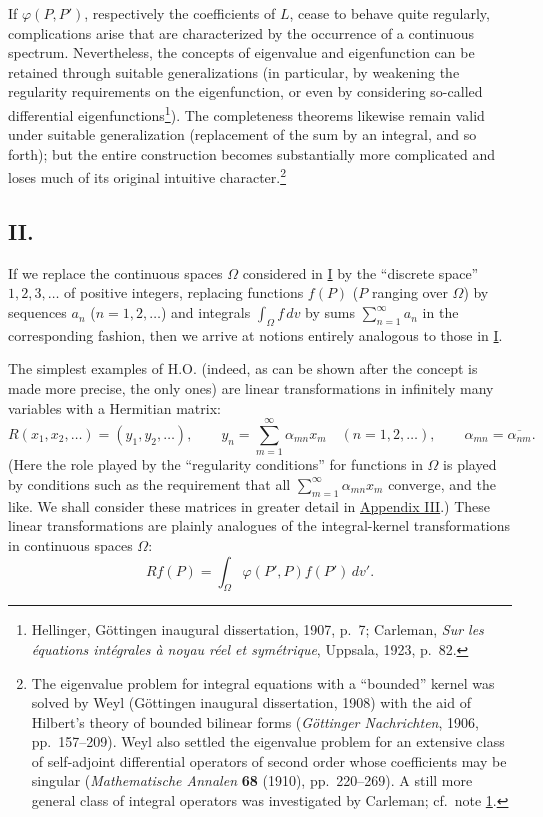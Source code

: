 ﻿\documentclass[paper=b5,fontsize=13pt,bookmarkpackage=false,twoside]{scrartcl}
\begin{document}
If $\varphi(P,P')$, respectively the coefficients of $L$, cease to behave quite regularly, complications arise that are characterized by the occurrence of a continuous spectrum. Nevertheless, the concepts of eigenvalue and eigenfunction can be retained through suitable generalizations (in particular, by weakening the regularity requirements on the eigenfunction, or even by considering so-called differential eigenfunctions\footnote{\label{fn:source-4}Hellinger, Göttingen inaugural dissertation, 1907, p.~7; Carleman, \emph{Sur les équations intégrales à noyau réel et symétrique}, Uppsala, 1923, p.~82.}). The completeness theorems likewise remain valid under suitable generalization (replacement of the sum by an integral, and so forth); but the entire construction becomes substantially more complicated and loses much of its original intuitive character.\footnote{\label{fn:source-5}The eigenvalue problem for integral equations with a ``bounded'' kernel was solved by Weyl (Göttingen inaugural dissertation, 1908) with the aid of Hilbert's theory of bounded bilinear forms (\emph{Göttinger Nachrichten}, 1906, pp.~157--209). Weyl also settled the eigenvalue problem for an extensive class of self-adjoint differential operators of second order whose coefficients may be singular (\emph{Mathematische Annalen} \textbf{68} (1910), pp.~220--269). A still more general class of integral operators was investigated by Carleman; cf.\ note \ref{fn:source-4}.}

\subsection*{II.}\label{intro:II}

If we replace the continuous spaces $\Omega$ considered in \hyperref[intro:I]{I} by the ``discrete space'' $1,2,3,\ldots$ of positive integers, replacing functions $f(P)$ ($P$ ranging over $\Omega$) by sequences $a_n$ ($n=1,2,\ldots$) and integrals $\int_\Omega f\,dv$ by sums $\sum_{n=1}^{\infty}a_n$ in the corresponding fashion, then we arrive at notions entirely analogous to those in \hyperref[intro:I]{I}.

The simplest examples of H.O. (indeed, as can be shown after the concept is made more precise, the only ones) are linear transformations in infinitely many variables with a Hermitian matrix:
\[
 R(x_1,x_2,\ldots)=(y_1,y_2,\ldots),
 \qquad
 y_n=\sum_{m=1}^{\infty}\alpha_{mn}x_m
 \quad(n=1,2,\ldots),
 \qquad
 \alpha_{mn}=\overline{\alpha_{nm}}.
\]
(Here the role played by the ``regularity conditions'' for functions in $\Omega$ is played by conditions such as the requirement that all $\sum_{m=1}^{\infty}\alpha_{mn}x_m$ converge, and the like. We shall consider these matrices in greater detail in \hyperref[app:III]{Appendix III}.) These linear transformations are plainly analogues of the integral-kernel transformations in continuous spaces $\Omega$:
\[
 Rf(P)=\int_\Omega\varphi(P',P)f(P')\,dv'.
\]
\end{document}
